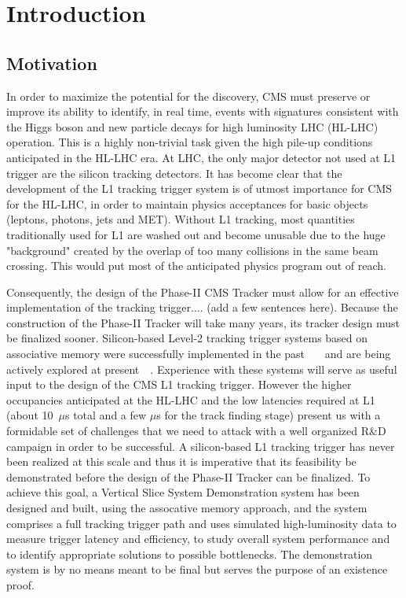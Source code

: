 
\section{Introduction \label{sec:intro}}

\subsection{Motivation}


In order to maximize the potential for the discovery, CMS must preserve or improve its ability to identify, in real time, events with signatures consistent with the Higgs boson and new particle decays for high luminosity LHC (HL-LHC) operation. This is a highly non-trivial task given the high pile-up conditions anticipated in the HL-LHC era. At LHC, the only major detector not used at L1 trigger are the silicon tracking detectors. It has become clear that the development of the L1 tracking trigger system is of utmost importance for CMS for the HL-LHC, in order to maintain physics acceptances for basic objects (leptons, photons, jets and MET).  Without L1 tracking, most quantities traditionally used for L1 are washed out and become unusable due to the huge "background" created by the overlap of too many collisions in the same beam crossing. This would put most of the anticipated physics program out of reach. 

Consequently, the design of the Phase-II CMS Tracker must allow for an effective implementation of the tracking trigger.... (add a few sentences here).  Because the construction of the Phase-II Tracker will take many years, its tracker design must be finalized sooner.    Silicon-based Level-2 tracking trigger systems based on associative memory were successfully implemented in the past~\cite{bib:Rist-89}~\cite{bib:Ade-06}~\cite{bib:Ade-07} and are being actively explored at present~\cite{bib:FTK-TP}~\cite{bib:FTK-TDR}. Experience with these systems will serve as useful input to the design of the CMS L1 tracking trigger. However the higher occupancies anticipated at the HL-LHC and the low latencies required at L1 (about 10~$\mu$s total and a few $\mu$s for the track finding stage) present us with a formidable set of challenges that we need to attack with a well organized R\&D campaign in order to be successful. A silicon-based L1 tracking trigger has never been realized at this scale and thus it is imperative that its feasibility be demonstrated before the design of the Phase-II Tracker can be finalized. To achieve this goal, a Vertical Slice System Demonstration system has been designed and built, using the assocative memory approach, and the  system comprises a full tracking trigger path and uses simulated high-luminosity data to measure trigger latency and efficiency, to study overall system performance and to identify appropriate solutions to possible bottlenecks. The demonstration system is by no means meant to be final  but serves the purpose of an existence proof.

